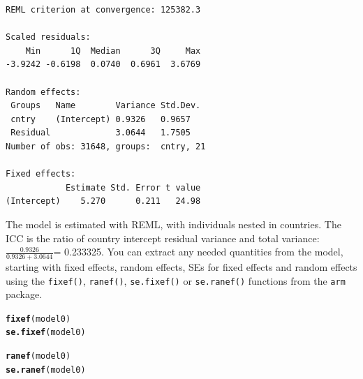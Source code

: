 \documentclass[12pt,english]{article}\usepackage[]{graphicx}\usepackage[usenames, dvipsnames]{xcolor}
\makeatletter
\newcommand{\hlstd}[1]{\textcolor[rgb]{0.345,0.345,0.345}{#1}}%
\newcommand{\hlkwd}[1]{\textcolor[rgb]{0.737,0.353,0.396}{\textbf{#1}}}%
\newenvironment{kframe}{%
 \def\at@end@of@kframe{}%
 \ifinner\ifhmode%
  \def\at@end@of@kframe{\end{minipage}}%
  \begin{minipage}{\columnwidth}%
 \fi\fi%
 \def\FrameCommand##1{\hskip\@totalleftmargin \hskip-\fboxsep
 \colorbox{shadecolor}{##1}\hskip-\fboxsep
     \hskip-\linewidth \hskip-\@totalleftmargin \hskip\columnwidth}%
 \MakeFramed {\advance\hsize-\width
   \@totalleftmargin\z@ \linewidth\hsize
   \@setminipage}}%
 {\par\unskip\endMakeFramed%
 \at@end@of@kframe}
\newenvironment{knitrout}{}{} %
\makeatother
\begin{document}
\begin{knitrout}
\begin{kframe}
\begin{verbatim}
REML criterion at convergence: 125382.3

Scaled residuals: 
    Min      1Q  Median      3Q     Max 
-3.9242 -0.6198  0.0740  0.6961  3.6769 

Random effects:
 Groups   Name        Variance Std.Dev.
 cntry    (Intercept) 0.9326   0.9657  
 Residual             3.0644   1.7505  
Number of obs: 31648, groups:  cntry, 21

Fixed effects:
            Estimate Std. Error t value
(Intercept)    5.270      0.211   24.98
\end{verbatim}
\end{kframe}
\end{knitrout}

The model is estimated with REML, with individuals nested in countries. The ICC is the ratio of country intercept residual variance and total variance: $\frac{0.9326}{0.9326+3.0644}$= 0.233325. You can extract any needed quantities from the model, starting with fixed effects, random effects, SEs for fixed effects and random effects using the \texttt{fixef()}, \texttt{ranef()}, \texttt{se.fixef()} or \texttt{se.ranef()} functions from the \texttt{arm} package.

\begin{knitrout}
\color{fgcolor}\begin{kframe}
\begin{alltt}
\hlkwd{fixef}\hlstd{(model0)}
\hlkwd{se.fixef}\hlstd{(model0)}
\end{alltt}
\end{kframe}
\end{knitrout}

\begin{knitrout}
\color{fgcolor}\begin{kframe}
\begin{alltt}
\hlkwd{ranef}\hlstd{(model0)}
\hlkwd{se.ranef}\hlstd{(model0)}
\end{alltt}
\end{kframe}
\end{knitrout}
\end{document}
